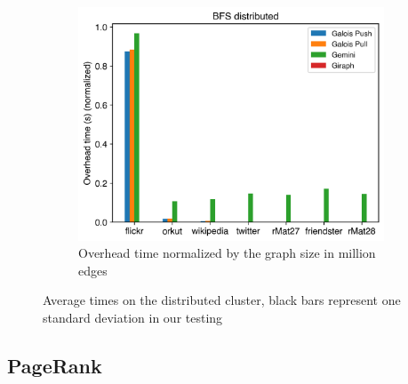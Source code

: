 \begin{figure}
\begin{subfigure}{0.3\textwidth}
		\includegraphics[width=\linewidth]{../../plots/distributedBFS_overheadTimeNormalized.png}
		\caption{Overhead time normalized by the graph size in million edges}
		\label{fig:distributedBFS_overheadNormalized}
	\end{subfigure}
	
	\caption{Average times on the distributed cluster, black bars represent one standard deviation in our testing}
\end{figure}



\subsection{PageRank}

